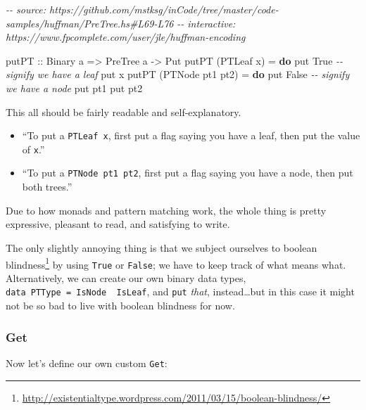 \documentclass[]{article}
\newenvironment{Shaded}{}{}
\newcommand{\CommentTok}[1]{\textcolor[rgb]{0.38,0.63,0.69}{\textit{#1}}}
\newcommand{\DataTypeTok}[1]{\textcolor[rgb]{0.56,0.13,0.00}{#1}}
\newcommand{\KeywordTok}[1]{\textcolor[rgb]{0.00,0.44,0.13}{\textbf{#1}}}
\newcommand{\NormalTok}[1]{#1}
\newcommand{\OtherTok}[1]{\textcolor[rgb]{0.00,0.44,0.13}{#1}}
\renewcommand{\href}[2]{#2\footnote{\url{#1}}}
\begin{document}
\begin{Shaded}
\begin{Highlighting}[]
\CommentTok{{-}{-} source: https://github.com/mstksg/inCode/tree/master/code{-}samples/huffman/PreTree.hs\#L69{-}L76}
\CommentTok{{-}{-} interactive: https://www.fpcomplete.com/user/jle/huffman{-}encoding}

\OtherTok{putPT ::} \DataTypeTok{Binary}\NormalTok{ a }\OtherTok{=>} \DataTypeTok{PreTree}\NormalTok{ a }\OtherTok{{-}>} \DataTypeTok{Put}
\NormalTok{putPT (}\DataTypeTok{PTLeaf}\NormalTok{ x) }\OtherTok{=} \KeywordTok{do}
\NormalTok{    put }\DataTypeTok{True}                    \CommentTok{{-}{-} signify we have a leaf}
\NormalTok{    put x}
\NormalTok{putPT (}\DataTypeTok{PTNode}\NormalTok{ pt1 pt2) }\OtherTok{=} \KeywordTok{do}
\NormalTok{    put }\DataTypeTok{False}                   \CommentTok{{-}{-} signify we have a node}
\NormalTok{    put pt1}
\NormalTok{    put pt2}
\end{Highlighting}
\end{Shaded}

This all should be fairly readable and self-explanatory.

\begin{itemize}
\item
  ``To put a \texttt{PTLeaf\ x}, first put a flag saying you have a leaf, then
  put the value of \texttt{x}.''
\item
  ``To put a \texttt{PTNode\ pt1\ pt2}, first put a flag saying you have a node,
  then put both trees.''
\end{itemize}

Due to how monads and pattern matching work, the whole thing is pretty
expressive, pleasant to read, and satisfying to write.

The only slightly annoying thing is that we subject ourselves to
\href{http://existentialtype.wordpress.com/2011/03/15/boolean-blindness/}{boolean
blindness} by using \texttt{True} or \texttt{False}; we have to keep track of
what means what. Alternatively, we can create our own binary data types,
\texttt{data\ PTType\ =\ IsNode\ \textbar{}\ IsLeaf}, and \texttt{put}
\emph{that}, instead\ldots but in this case it might not be so bad to live with
boolean blindness for now.

\hypertarget{get}{%
\subsubsection{Get}\label{get}}

Now let's define our own custom \texttt{Get}:
\end{document}
